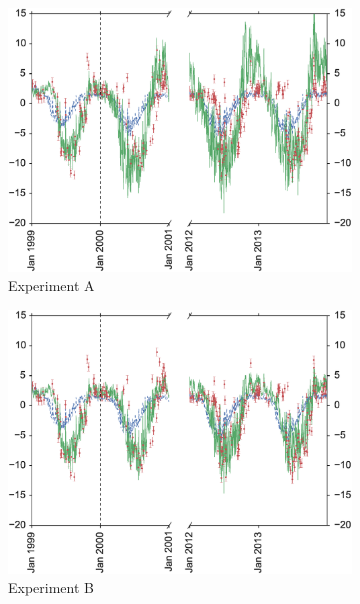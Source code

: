 \documentclass[11pt]{article}
\begin{document}
\begin{figure}
    \centering
    \begin{subfigure}[b]{0.49\textwidth}
        \includegraphics[width=\textwidth]{Abroke4dvarcvt.eps}
        \caption{Experiment A}
        \label{fig:4dvardiagBR}
    \end{subfigure}
    \begin{subfigure}[b]{0.49\textwidth}
        \includegraphics[width=\textwidth]{Bbroke4dvarcvt.eps}
        \caption{Experiment B}
        \label{fig:4dvaredcBR}
    \end{subfigure}
    \begin{subfigure}[b]{0.49\textwidth}

\end{subfigure}
\end{figure}
\end{document}
